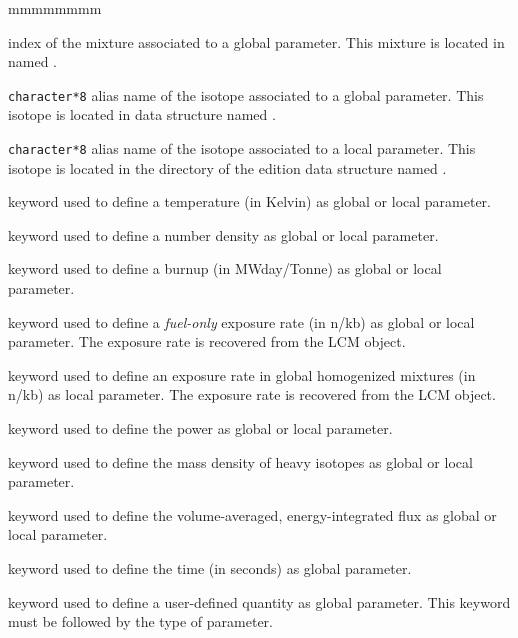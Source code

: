 \begin{ListeDeDescription}{mmmmmmmm}
\item[\dusa{imix}] index of the mixture associated to a global parameter. This mixture is
located in  named .

\item[\dusa{HISO1}] {\tt character*8} alias name of the isotope associated to a global
parameter. This isotope is located in  data structure named .

\item[\dusa{HISO2}] {\tt character*8} alias name of the isotope associated to a local
parameter. This isotope is located in the  directory of the {\sc edition}
data structure named .

\item[\moc{TEMP}] keyword used to define a temperature (in Kelvin) as global or
local parameter.

\item[\moc{CONC}] keyword used to define a number density as global or
local parameter.

\item[\moc{IRRA}] keyword used to define a burnup (in MWday/Tonne) as global
or local parameter.

\item[\moc{FLUB}] keyword used to define a {\sl fuel-only} exposure rate (in n/kb) as global
or local parameter. The exposure rate is recovered from the 
LCM object.

\item[\moc{FLUG}] keyword used to define an exposure rate in global homogenized mixtures (in n/kb) as
local parameter. The exposure rate is recovered from the 
LCM object.

\item[\moc{POWR}] keyword used to define the power as global or
local parameter.

\item[\moc{MASL}] keyword used to define the mass density of heavy isotopes as
global or local parameter.

\item[\moc{FLUX}] keyword used to define the volume-averaged, energy-integrated flux as
global or local parameter.

\item[\moc{TIME}] keyword used to define the time (in seconds) as global parameter.

\item[\moc{VALU}] keyword used to define a user-defined quantity as global parameter.
This keyword must be followed by the type of parameter.


\end{ListeDeDescription}
